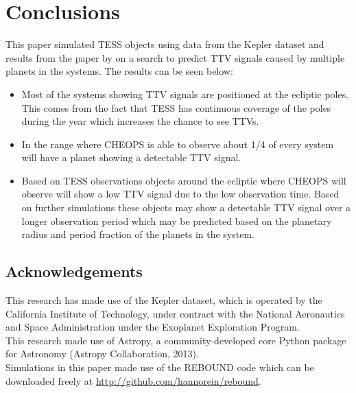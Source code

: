 \documentclass[12pt]{report}
\newcommand{\mnras}{MNRAS}
\newcommand{\aap}{A\&A}
\begin{document}
\chapter{Conclusions}
	This paper simulated TESS objects using data from the Kepler dataset and results from the paper by \cite{2015ApJ...809...77S} on a search to predict TTV signals caused by multiple planets in the systems. The results can be seen below:
	\begin{itemize}
		\item Most of the systems showing TTV signals are positioned at the ecliptic poles. This comes from the fact that TESS has continuous coverage of the poles during the year which increases the chance to see TTVs.
		\item In the range where CHEOPS is able to observe about 1/4 of every system will have a planet showing a detectable TTV signal.
		\item Based on TESS observations objects around the ecliptic where CHEOPS will observe will show a low TTV signal due to the low observation time. Based on further simulations these objects may show a detectable TTV signal over a longer observation period which may be predicted based on the planetary radius and period fraction of the planets in the system.
	\end{itemize}

\section*{Acknowledgements}
This research has made use of the Kepler dataset, which is operated by the California Institute of Technology, under contract with the National Aeronautics and Space Administration under the Exoplanet Exploration Program. \vspace{0.5cm}\\
This research made use of Astropy, a community-developed core Python package for Astronomy (Astropy Collaboration, 2013).\vspace{0.5cm}\\
Simulations in this paper made use of the REBOUND code which can be downloaded freely at \url{http://github.com/hannorein/rebound}.



%
\end{document}
